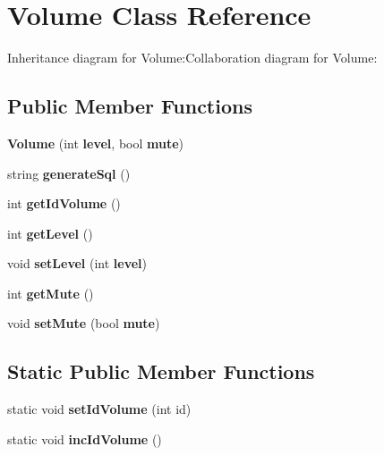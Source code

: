 \section{Volume Class Reference}
\label{classbr_1_1ufscar_1_1lince_1_1ginga_1_1recommender_1_1Volume}
Inheritance diagram for Volume:Collaboration diagram for Volume:\subsection*{Public Member Functions}
\begin{CompactItemize}
\item 
\textbf{Volume} (int {\bf level}, bool {\bf mute})\label{classbr_1_1ufscar_1_1lince_1_1ginga_1_1recommender_1_1Volume_bba4c21c2e3dc8b336ccb3a49fec8722}

\item 
string \textbf{generateSql} ()\label{classbr_1_1ufscar_1_1lince_1_1ginga_1_1recommender_1_1Volume_8f1e45f781da9a5727416350efd7d586}

\item 
int \textbf{getIdVolume} ()\label{classbr_1_1ufscar_1_1lince_1_1ginga_1_1recommender_1_1Volume_99b55e81bc9c44f34cf535e9d4cab417}

\item 
int \textbf{getLevel} ()\label{classbr_1_1ufscar_1_1lince_1_1ginga_1_1recommender_1_1Volume_8c6fea79d2b1d923386e86255bcf9317}

\item 
void \textbf{setLevel} (int {\bf level})\label{classbr_1_1ufscar_1_1lince_1_1ginga_1_1recommender_1_1Volume_4c47f9adbca525f247fe53e4bc945a6d}

\item 
int \textbf{getMute} ()\label{classbr_1_1ufscar_1_1lince_1_1ginga_1_1recommender_1_1Volume_de5f61672c624a809db60667ab767954}

\item 
void \textbf{setMute} (bool {\bf mute})\label{classbr_1_1ufscar_1_1lince_1_1ginga_1_1recommender_1_1Volume_27459cee4bd97a6ac4a09aec45cd3bbd}

\end{CompactItemize}
\subsection*{Static Public Member Functions}
\begin{CompactItemize}
\item 
static void \textbf{setIdVolume} (int id)\label{classbr_1_1ufscar_1_1lince_1_1ginga_1_1recommender_1_1Volume_172424edf0e871153c6d594b26b7d578}

\item 
static void \textbf{incIdVolume} ()\label{classbr_1_1ufscar_1_1lince_1_1ginga_1_1recommender_1_1Volume_994ad483684b2aeb87b587011b7ba998}

\end{CompactItemize}
